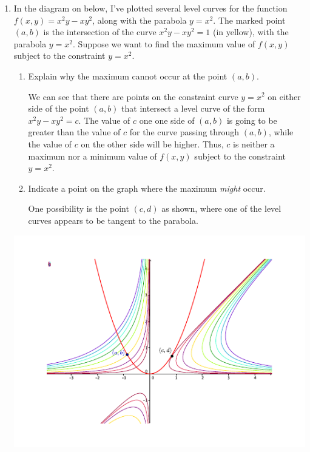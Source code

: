 \documentclass[letterpaper,12pt]{article}
\begin{document}
\begin{enumerate}
\pagebreak
\item In the diagram on below, I've plotted several level curves for the function $f(x,y)=x^2y-xy^2$, along with the parabola $y=x^2$. The marked point $(a,b)$ is the intersection of the curve $x^2y-xy^2=1$ (in yellow), with the parabola $y=x^2$. Suppose we want to find the maximum value of $f(x,y)$ subject to the constraint $y=x^2$.
\begin{enumerate}
 \item Explain why the maximum cannot occur at the point $(a,b)$.

\bigskip

We can see that there are points on the constraint curve $y=x^2$ on either side of the point $(a,b)$ that intersect a level curve of the form $x^2y-xy^2=c$. The value of $c$ one one side of $(a,b)$ is going to be greater than the value of $c$ for the curve passing through $(a,b)$, while the value of $c$ on the other side will be higher. Thus, $c$ is neither a maximum nor a minimum value of $f(x,y)$ subject to the constraint $y=x^2$.

 \item Indicate a point on the graph where the maximum {\em might} occur.

\bigskip

One possibility is the point $(c,d)$ as shown, where one of the level curves appears to be tangent to the parabola.
\end{enumerate}

\begin{center}
 \includegraphics[width=\textwidth]{Q8-3ans}
\end{center}

\end{enumerate}
\end{document}
